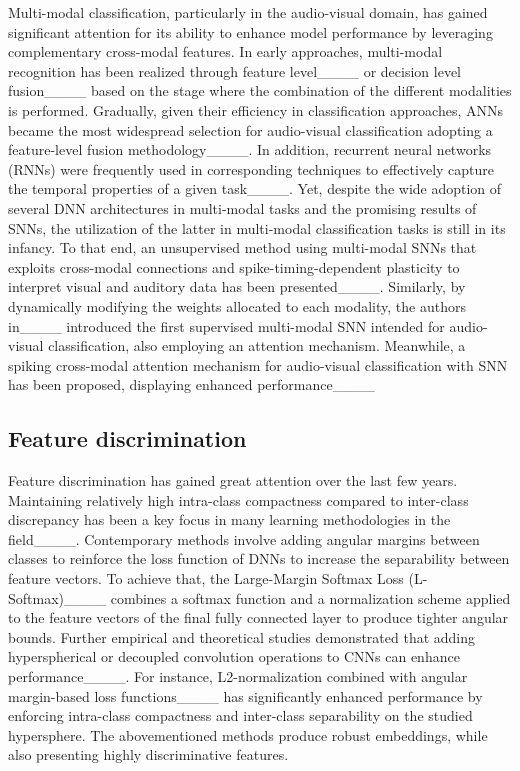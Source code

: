 Multi-modal classification, particularly in the audio-visual domain, has gained significant attention for its ability to enhance model performance by leveraging complementary cross-modal features.
In early approaches, multi-modal recognition has been realized through feature level____ or decision level fusion____ based on the stage where the combination of the different modalities is performed. 
Gradually, given their efficiency in classification approaches, ANNs became the most widespread selection for audio-visual classification adopting a feature-level fusion methodology____.
In addition, recurrent neural networks (RNNs) were frequently used in corresponding techniques to effectively capture the temporal properties of a given task____.
Yet, despite the wide adoption of several DNN architectures in multi-modal tasks and the promising results of SNNs, the utilization of the latter in multi-modal classification tasks is still in its infancy.
To that end, an unsupervised method using multi-modal SNNs that exploits cross-modal connections and spike-timing-dependent plasticity to interpret visual and auditory data has been presented____.
Similarly, by dynamically modifying the weights allocated to each modality, the authors in____ introduced the first supervised multi-modal SNN intended for audio-visual classification, also employing an attention mechanism.
Meanwhile, a spiking cross-modal attention mechanism for audio-visual classification with SNN has been proposed, displaying enhanced performance____

\subsection{Feature discrimination}
Feature discrimination has gained great attention over the last few years.
Maintaining relatively high intra-class compactness compared to inter-class discrepancy has been a key focus in many learning methodologies in the field____.
Contemporary methods involve adding angular margins between classes to reinforce the loss function of DNNs to increase the separability between feature vectors. 
To achieve that, the Large-Margin Softmax Loss (L-Softmax)____ combines a softmax function and a normalization scheme applied to the feature vectors of the final fully connected layer to produce tighter angular bounds.
Further empirical and theoretical studies demonstrated that adding hyperspherical or decoupled convolution operations to CNNs can enhance performance____. 
For instance, L2-normalization combined with angular margin-based loss functions____ has significantly enhanced performance by enforcing intra-class compactness and inter-class separability on the studied hypersphere.
The abovementioned methods produce robust embeddings, while also presenting highly discriminative features.